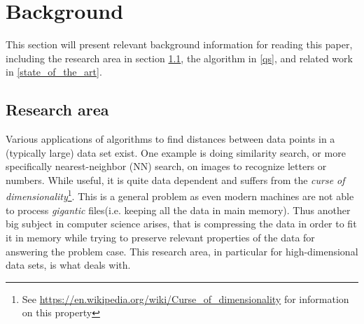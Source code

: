 \section{Background}
\label{background}
This section will present relevant background information for reading this paper, including the research area in section \ref{research_area}, the \qs{} algorithm in \ref{qs}, and related work in \ref{state_of_the_art}.

\subsection{Research area}
\label{research_area}
Various applications of algorithms to find distances between data points in a (typically large) data set exist. One example is doing similarity search, or more specifically nearest-neighbor (NN) search, on images to recognize letters or numbers. While useful, it is quite data dependent and suffers from the \textit{curse of dimensionality}\footnote{See \url{https://en.wikipedia.org/wiki/Curse_of_dimensionality} for information on this property}. This is a general problem as even modern machines are not able to process \textit{gigantic} files(i.e. keeping all the data in main memory). Thus another big subject in computer science arises, that is compressing the data in order to fit it in memory while trying to preserve relevant properties of the data for answering the problem case. This research area, in particular for high-dimensional data sets, is what \qs{} deals with.
